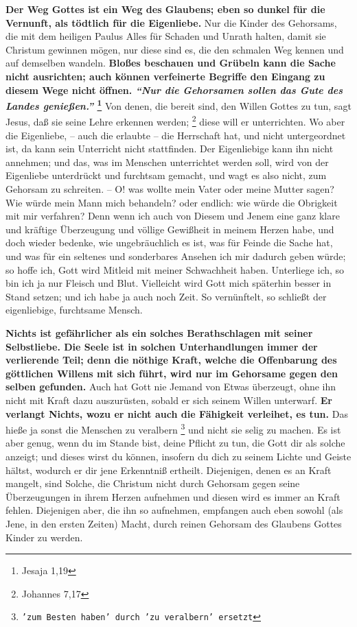 \textbf{Der Weg Gottes ist ein Weg des Glaubens; eben so dunkel für die
Vernunft,  als
tödtlich für die Eigenliebe.} Nur die Kinder des Gehorsams,  die mit dem heiligen
Paulus Alles für Schaden und Unrath halten, damit sie Christum gewinnen mögen,
nur diese sind es, die den schmalen Weg kennen und auf demselben wandeln.
\textbf{Bloßes
beschauen und Grübeln kann die Sache nicht ausrichten; auch können verfeinerte
Begriffe den Eingang zu diesem Wege nicht öffnen.
\textit{"`Nur die Gehorsamen sollen das Gute des Landes genießen."'}
\footnote{Jesaja 1,19}}
Von denen, die bereit sind,
den Willen Gottes zu tun, sagt Jesus, daß sie seine Lehre erkennen
werden;
\footnote{Johannes 7,17}
diese will er unterrichten. Wo aber die Eigenliebe,
-- auch die erlaubte -- die Herrschaft hat, und nicht untergeordnet ist, da kann
sein Unterricht nicht stattfinden. Der Eigenliebige kann ihn nicht annehmen; und
das, was im Menschen unterrichtet werden soll, wird von der Eigenliebe
unterdrückt und furchtsam gemacht, und wagt es also nicht, zum Gehorsam zu
schreiten. -- O! was wollte mein Vater oder meine Mutter sagen? Wie würde mein
Mann mich behandeln? oder endlich: wie würde die Obrigkeit mit mir verfahren?
Denn wenn ich auch von Diesem und Jenem eine ganz klare und kräftige
Überzeugung und völlige Gewißheit in meinem Herzen habe, und doch wieder
bedenke, wie ungebräuchlich es ist, was für Feinde die Sache hat, und was für
ein seltenes und sonderbares Ansehen ich mir dadurch geben würde; so hoffe ich,
Gott wird Mitleid mit meiner Schwachheit haben. Unterliege ich, so bin ich ja
nur Fleisch und Blut. Vielleicht wird Gott mich späterhin besser in Stand
setzen; und ich habe ja auch noch Zeit. So vernünftelt, so schließt der
eigenliebige, furchtsame Mensch.

\medskip

\textbf{Nichts ist gefährlicher als ein solches Berathschlagen mit seiner Selbstliebe.
Die Seele ist in solchen Unterhandlungen immer der verlierende Teil;
denn die
nöthige Kraft, welche die Offenbarung des göttlichen Willens mit sich führt,
wird nur im Gehorsame gegen den selben gefunden.} Auch hat Gott nie Jemand von
Etwas überzeugt, ohne ihn nicht mit Kraft dazu auszurüsten, sobald er sich
seinem Willen unterwarf. \textbf{Er verlangt Nichts, wozu er nicht auch die
Fähigkeit
verleihet, es tun.} Das hieße ja sonst die Menschen zu veralbern \footnote{\texttt{'zum Besten haben' durch 'zu veralbern' ersetzt}} und nicht sie
selig zu machen. Es ist aber genug, wenn du im Stande bist, deine Pflicht zu
tun, die Gott dir als solche anzeigt; und dieses wirst du können, insofern du
dich zu seinem Lichte und Geiste hältst, wodurch er dir jene Erkenntniß
ertheilt. Diejenigen, denen es an Kraft mangelt, sind Solche, die Christum nicht
durch Gehorsam gegen seine Überzeugungen in ihrem Herzen aufnehmen und diesen
wird es immer an Kraft fehlen. Diejenigen aber, die ihn so aufnehmen, empfangen
auch eben sowohl (als Jene, in den ersten Zeiten) Macht, durch reinen Gehorsam
des Glaubens Gottes Kinder zu werden.


